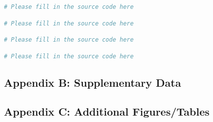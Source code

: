 \documentclass{apmcmthesis}
\begin{document}
\begin{lstlisting}[language=python,caption={Python Source Code for Question 2}]
# Please fill in the source code here
\end{lstlisting}

\begin{lstlisting}[language=python,caption={Python Source Code for Question 3}]
# Please fill in the source code here
\end{lstlisting}

\begin{lstlisting}[language=python,caption={Python Source Code for Question 4}]
# Please fill in the source code here
\end{lstlisting}

\begin{lstlisting}[language=python,caption={Python Source Code for Question 5}]
# Please fill in the source code here
\end{lstlisting}

\subsection{Appendix B: Supplementary Data}

\subsection{Appendix C: Additional Figures/Tables}
\end{document}
